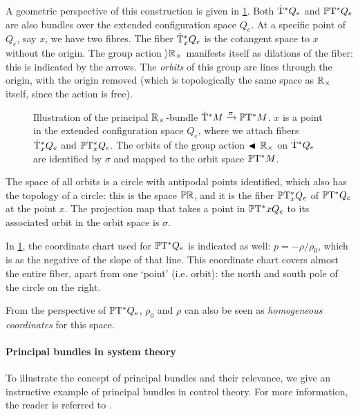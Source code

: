 A geometric perspective of this construction is given in \cref{fig:principal_bundle}. Both \(\mathrm{\dot{T}}^*Q_e\) and \(\mathbb{P}\mathrm{T}^* Q_e\) are also bundles over the extended configuration space \(Q_e\). At a specific point of \(Q_e\), say \(x\), we have two fibres. The fiber \(\mathrm{\dot{T}}^*_{x} Q_e\) is the cotangent space to \(x\) without the origin. The group action \(\rangle{\ensuremath{\mathbb{R}_{\times}}}\) manifests itself as dilations of the fiber: this is indicated by the arrows. The \emph{orbits} of this group are lines through the origin, with the origin removed (which is topologically the same space as \(\mathbb{R}_{\times}\) itself, since the action is free). 
\begin{figure}[ht!]
    \centering
    
    \caption{Illustration of the principal \(\mathbb{R}_{\times}\)-bundle \(\mathrm{\dot{T}}^*M\xrightarrow[]{\pi}\mathbb{P}\mathrm{T}^* M\). \(x\) is a point in the extended configuration space \(Q_e\), where we attach fibers \(\mathrm{\dot{T}}^*_{x} Q_e\) and \(\mathbb{P}\mathrm{T}^*_{x} Q_e\). The orbits of the group action \(\blacktriangleleft\,\mathbb{R}_{\times}\) on \(\mathrm{\dot{T}}^*Q_e\) are identified by \(\sigma\) and mapped to the orbit space \(\mathbb{P}\mathrm{T}^* M\). }
    \label{fig:principal_bundle}
\end{figure}

The space of all orbits is a circle with antipodal points identified, which also has the topology of a circle: this is the space \(\mathbb{P}\mathbb{R}\), and it is the fiber \(\mathbb{P}\mathrm{T}^*_{x} Q_e\) of \(\mathbb{P}\mathrm{T}^* Q_e\) at the point \(x\). The projection map that takes a point in \(\mathbb{P}\mathrm{T}^* x{Q_e}\) to its associated orbit in the orbit space is \(\sigma\). 

In \cref{fig:principal_bundle}, the coordinate chart used for \(\mathbb{P}\mathrm{T}^* Q_e\) is indicated as well: \(p = -\rho/\rho_0\), which is as the negative of the slope of that line. This coordinate chart covers almost the entire fiber, apart from one `point' (i.e. orbit): the north and south pole of the circle on the right.

From the perspective of \(\mathbb{P}\mathrm{T}^* Q_e\), \(\rho_0\) and \(\rho\) can also be seen as \emph{homogeneous coordinates} for this space.

\paragraph{Principal bundles in system theory}
To illustrate the concept of principal bundles and their relevance, we give an instructive example of principal bundles in control theory. For more information, the reader is referred to \citet{Hermann1984}. 

